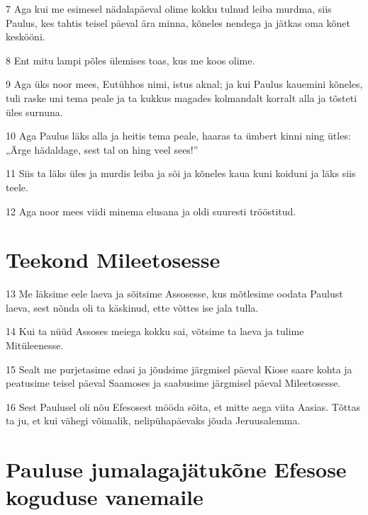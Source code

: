 \par 7 Aga kui me esimesel nädalapäeval olime kokku tulnud leiba murdma, siis Paulus, kes tahtis teisel päeval ära minna, kõneles nendega ja jätkas oma kõnet keskööni.
\par 8 Ent mitu lampi põles ülemises toas, kus me koos olime.
\par 9 Aga üks noor mees, Eutühhos nimi, istus aknal; ja kui Paulus kauemini kõneles, tuli raske uni tema peale ja ta kukkus magades kolmandalt korralt alla ja tõsteti üles surnuna.
\par 10 Aga Paulus läks alla ja heitis tema peale, haaras ta ümbert kinni ning ütles: „Ärge hädaldage, sest tal on hing veel sees!”
\par 11 Siis ta läks üles ja murdis leiba ja sõi ja kõneles kaua kuni koiduni ja läks siis teele.
\par 12 Aga noor mees viidi minema elusana ja oldi suuresti trööstitud.

\section*{Teekond Mileetosesse}

\par 13 Me läksime eele laeva ja sõitsime Assosesse, kus mõtlesime oodata Paulust laeva, sest nõnda oli ta käskinud, ette võttes ise jala tulla.
\par 14 Kui ta nüüd Assoses meiega kokku sai, võtsime ta laeva ja tulime Mitüleenesse.
\par 15 Sealt me purjetasime edasi ja jõudsime järgmisel päeval Kiose saare kohta ja peatusime teisel päeval Saamoses ja saabusime järgmisel päeval Mileetosesse.
\par 16 Sest Paulusel oli nõu Efesosest mööda sõita, et mitte aega viita Aasias. Tõttas ta ju, et kui vähegi võimalik, nelipühapäevaks jõuda Jeruusalemma.

\section*{Pauluse jumalagajätukõne Efesose koguduse vanemaile}

